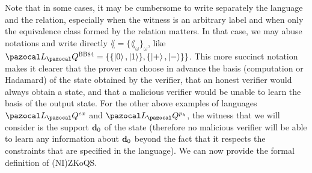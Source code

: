 Note that in some cases, it may be cumbersome to write separately the language and the relation, especially when the witness is an arbitrary label and when only the equivalence class formed by the relation matters. In that case, we may abuse notations and write directly $\lang = \{ \lang_\omega \}_\omega$, like $\lang_\cQ^{\BBHeightyFor{}} = \{\{\ket{0},\ket{1}\},\{\ket{+},\ket{-}\}\}$. This more succinct notation makes it clearer that the prover can choose in advance the basis (computation or Hadamard) of the state obtained by the verifier, that an honest verifier would always obtain a \BBHeightyFor{} state, and that a malicious verifier would be unable to learn the basis of the output state. For the other above examples of languages $\lang_\cQ^{ex}$ and $\lang_\cQ^{p_k}$, the witness that we will consider is the support $\mathbf{d}_0$ of the \GHZ{} state (therefore no malicious verifier will be able to learn any information about $\mathbf{d}_0$ beyond the fact that it respects the constraints that are specified in the language). We can now provide the formal definition of (NI)ZKoQS.

